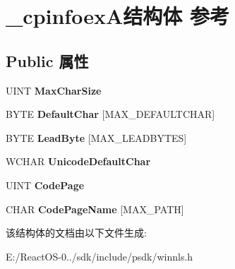 \hypertarget{struct__cpinfoex_a}{}\section{\+\_\+cpinfoex\+A结构体 参考}
\label{struct__cpinfoex_a}
\subsection*{Public 属性}
\begin{DoxyCompactItemize}
\item 
\mbox{\label{struct__cpinfoex_a_a2896f98d4ff2cc377c7f8a350d279e65}} 
U\+I\+NT {\bfseries Max\+Char\+Size}
\item 
\mbox{\label{struct__cpinfoex_a_a6a6ca6f95e3c242d2d21ae3860caa168}} 
B\+Y\+TE {\bfseries Default\+Char} \mbox{[}M\+A\+X\+\_\+\+D\+E\+F\+A\+U\+L\+T\+C\+H\+AR\mbox{]}
\item 
\mbox{\label{struct__cpinfoex_a_a8860f8d613513fe69c6fe5da38e35d07}} 
B\+Y\+TE {\bfseries Lead\+Byte} \mbox{[}M\+A\+X\+\_\+\+L\+E\+A\+D\+B\+Y\+T\+ES\mbox{]}
\item 
\mbox{\label{struct__cpinfoex_a_a7a75f5d479c11d73bd3135d8c90a5781}} 
W\+C\+H\+AR {\bfseries Unicode\+Default\+Char}
\item 
\mbox{\label{struct__cpinfoex_a_af2e083c596ab8e6c555350e3f4d3bd6d}} 
U\+I\+NT {\bfseries Code\+Page}
\item 
\mbox{\label{struct__cpinfoex_a_a900f8ef205b9cb1fc4c0859f3c6dc7d6}} 
C\+H\+AR {\bfseries Code\+Page\+Name} \mbox{[}M\+A\+X\+\_\+\+P\+A\+TH\mbox{]}
\end{DoxyCompactItemize}


该结构体的文档由以下文件生成\+:\begin{DoxyCompactItemize}
\item 
E\+:/\+React\+O\+S-\/0../sdk/include/psdk/winnls.\+h\end{DoxyCompactItemize}
